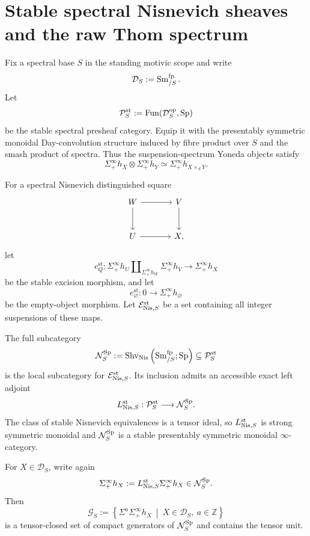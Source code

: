 \section{Stable spectral Nisnevich sheaves and the raw Thom spectrum}
\label{sec:infinitesimal-stable-nis-raw-thom}

Fix a spectral base $S$ in the standing motivic scope and write
\[
    \mathcal D_S:=\operatorname{Sm}^{\mathrm{fp}}_{/S}.
\]
Let
\[
    \mathcal P_S^{\mathrm{st}}
    :=
    \operatorname{Fun}(\mathcal D_S^{\mathrm{op}},\mathrm{Sp})
\]
be the stable spectral presheaf category.  Equip it with the presentably
symmetric monoidal Day-convolution structure induced by fibre product over
$S$ and the smash product of spectra.  Thus the suspension-spectrum Yoneda
objects satisfy
\[
    \Sigma^\infty_+h_X\otimes\Sigma^\infty_+h_Y
    \simeq
    \Sigma^\infty_+h_{X\times_SY}.
\]

For a spectral Nisnevich distinguished square
\[
\begin{tikzcd}[column sep=large,row sep=large]
    W \ar[r] \ar[d] & V \ar[d]\\
    U \ar[r] & X,
\end{tikzcd}
\]
let
\[
    e_Q^{\mathrm{st}}:
    \Sigma^\infty_+h_U
    \amalg_{\Sigma^\infty_+h_W}
    \Sigma^\infty_+h_V
    \longrightarrow
    \Sigma^\infty_+h_X
\]
be the stable excision morphism, and let
\[
    e_\varnothing^{\mathrm{st}}:
    0\longrightarrow\Sigma^\infty_+h_\varnothing
\]
be the empty-object morphism.  Let $\mathcal E^{\mathrm{st}}_{\mathrm{Nis},S}$ be a
set containing all integer suspensions of these maps.

\begin{proposition}
\label{prop:infinitesimal-stable-nisnevich}
The full subcategory
\[
    \mathcal N_S^{\mathrm{Sp}}
    :=
    \operatorname{Shv}_{\mathrm{Nis}}
    \left(
        \operatorname{Sm}^{\mathrm{fp}}_{/S};
        \mathrm{Sp}
    \right)
    \subseteq
    \mathcal P_S^{\mathrm{st}}
\]
is the local subcategory for $\mathcal E^{\mathrm{st}}_{\mathrm{Nis},S}$.  Its
inclusion admits an accessible exact left adjoint
\[
    L^{\mathrm{st}}_{\mathrm{Nis},S}:
    \mathcal P_S^{\mathrm{st}}
    \longrightarrow
    \mathcal N_S^{\mathrm{Sp}}.
\]
The class of stable Nisnevich equivalences is a tensor ideal, so
$L^{\mathrm{st}}_{\mathrm{Nis},S}$ is strong symmetric monoidal and $\mathcal N_S^{\mathrm{Sp}}$
is a stable presentably symmetric monoidal $\infty$-category.

For $X\in\mathcal D_S$, write again
\[
    \Sigma^\infty_+h_X
    :=
    L^{\mathrm{st}}_{\mathrm{Nis},S}\Sigma^\infty_+h_X
    \in\mathcal N_S^{\mathrm{Sp}}.
\]
Then
\[
    \mathcal G_S
    :=
    \left\{
        \Sigma^a\Sigma^\infty_+h_X
        \ \middle|\
        X\in\mathcal D_S,\ a\in\mathbb Z
    \right\}
\]
is a tensor-closed set of compact generators of $\mathcal N_S^{\mathrm{Sp}}$ and contains
the tensor unit.
\end{proposition}

